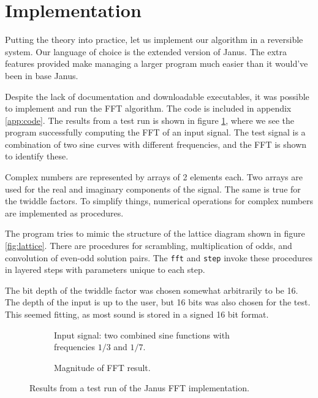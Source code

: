\section{Implementation}
Putting the theory into practice,
let us implement our algorithm in a reversible system.
Our language of choice is the extended version\cite{extjanus} of Janus\cite{janus2007}.
The extra features provided make managing a larger program much easier
than it would've been in base Janus.

Despite the lack of documentation and downloadable executables,
it was possible to implement and run the FFT algorithm.
The code is included in appendix \ref{app:code}.
The results from a test run is shown in figure \ref{fig:test},
where we see the program successfully computing the FFT of an input signal.
The test signal is a combination of two sine curves with different frequencies,
and the FFT is shown to identify these.

Complex numbers are represented by arrays of 2 elements each.
Two arrays are used for the real and imaginary components of the signal.
The same is true for the twiddle factors.
To simplify things, numerical operations for complex numbers are implemented as procedures.

The program tries to mimic the structure of the lattice diagram shown in figure \ref{fig:lattice}.
There are procedures for scrambling, multiplication of odds,
and convolution of even-odd solution pairs.
The \texttt{fft} and \texttt{step} invoke these procedures in layered steps
with parameters unique to each step.

The bit depth of the twiddle factor was chosen somewhat arbitrarily to be 16.
The depth of the input is up to the user,
but 16 bits was also chosen for the test.
This seemed fitting, as most sound is stored in a signed 16 bit format.

\begin{figure}
    \centering
    \begin{subfigure}[b]{0.8\textwidth}
        \resizebox{\textwidth}{!}{}
        \caption{Input signal: two combined sine functions with frequencies $1/3$ and $1/7$.}
    \end{subfigure}
    \begin{subfigure}[b]{0.8\textwidth}
        \resizebox{\textwidth}{!}{}
        \caption{Magnitude of FFT result.}
    \end{subfigure}
    \caption{Results from a test run of the Janus FFT implementation.\label{fig:test}}
\end{figure}
